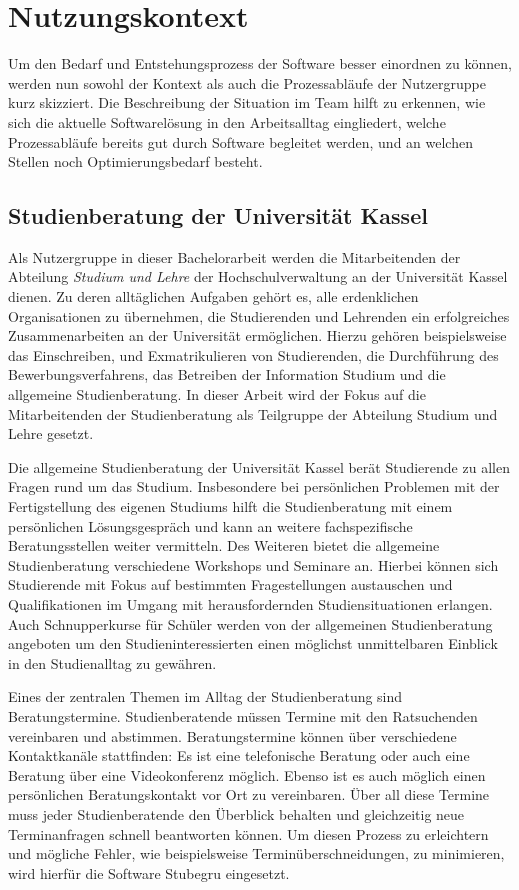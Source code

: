 \chapter{Nutzungskontext}
\label{chapter:user-context}

Um den Bedarf und Entstehungsprozess der Software besser einordnen zu können,
werden nun sowohl der Kontext als auch die Prozessabläufe der Nutzergruppe kurz
skizziert. Die Beschreibung der Situation im Team hilft zu erkennen, wie sich
die aktuelle Softwarelösung in den Arbeitsalltag eingliedert, welche
Prozessabläufe bereits gut durch Software begleitet werden, und an welchen
Stellen noch Optimierungsbedarf besteht.

\section{Studienberatung der Universität Kassel}
Als Nutzergruppe in dieser Bachelorarbeit werden die Mitarbeitenden der
Abteilung \textit{Studium und Lehre} der Hochschulverwaltung an der Universität
Kassel dienen. Zu deren alltäglichen Aufgaben gehört es, alle erdenklichen
Organisationen zu übernehmen, die Studierenden und Lehrenden ein erfolgreiches
Zusammenarbeiten an der Universität ermöglichen. Hierzu gehören beispielsweise
das Einschreiben, und Exmatrikulieren von Studierenden, die Durchführung des
Bewerbungsverfahrens, das Betreiben der Information Studium und die allgemeine
Studienberatung. In dieser Arbeit wird der Fokus auf die Mitarbeitenden der
Studienberatung als Teilgruppe der Abteilung Studium und Lehre gesetzt.

Die allgemeine Studienberatung der Universität Kassel berät Studierende zu
allen Fragen rund um das Studium. Insbesondere bei persönlichen Problemen mit
der Fertigstellung des eigenen Studiums hilft die Studienberatung mit einem
persönlichen Lösungsgespräch und kann an weitere fachspezifische
Beratungsstellen weiter vermitteln. Des Weiteren bietet die allgemeine
Studienberatung verschiedene Workshops und Seminare an. Hierbei können sich
Studierende mit Fokus auf bestimmten Fragestellungen austauschen und
Qualifikationen im Umgang mit herausfordernden Studiensituationen erlangen.
Auch Schnupperkurse für Schüler werden von der allgemeinen Studienberatung
angeboten um den Studieninteressierten einen möglichst unmittelbaren Einblick
in den Studienalltag zu gewähren.\cite{studBeratungKsWeb}

Eines der zentralen Themen im Alltag der Studienberatung sind Beratungstermine.
Studienberatende müssen Termine mit den Ratsuchenden vereinbaren und abstimmen.
Beratungstermine können über verschiedene Kontaktkanäle stattfinden: Es ist
eine telefonische Beratung oder auch eine Beratung über eine Videokonferenz
möglich. Ebenso ist es auch möglich einen persönlichen Beratungskontakt vor Ort
zu vereinbaren. Über all diese Termine muss jeder Studienberatende den
Überblick behalten und gleichzeitig neue Terminanfragen schnell beantworten
können. Um diesen Prozess zu erleichtern und mögliche Fehler, wie
beispielsweise Terminüberschneidungen, zu minimieren, wird hierfür die Software
\gls{Stubegru} eingesetzt.

